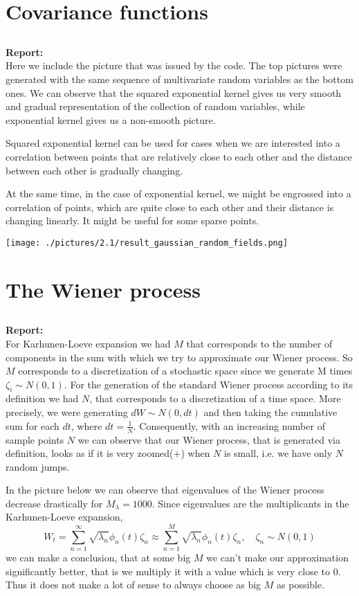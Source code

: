 \documentclass[11pt]{article}
\newcommand{\subass}{\subsection{}}
\newcommand{\report}{\textbf{Report: \\}}
\begin{document}
\section{Covariance functions} 
\subass
\report
Here we include the picture that was issued by the code. The top pictures were generated with the same sequence of multivariate random variables as the bottom ones. We can observe that the squared exponential kernel gives us very smooth and gradual representation of the collection of random variables, while exponential kernel gives us a non-smooth picture.\par
Squared exponential kernel can be used for cases when we are interested into a correlation between points that are relatively close to each other and the distance between each other is gradually changing.\par 
At the same time, in the case of exponential kernel, we might be engrossed into a correlation of points, which are quite close to each other and their distance is changing linearly. It might be useful for some sparse points.

\texttt{[image: ./pictures/2.1/result\_gaussian\_random\_fields.png]}

\section{The Wiener process} 
\subass
\report
For Karhunen-Loeve expansion we had $M$ that corresponds to the number of components in the sum with which we try to approximate our Wiener process. So $M$ corresponds to a discretization of a stochastic space since we generate M times $\zeta_i \sim N(0,1)$.
For the generation of the standard Wiener process according to its definition we had $N$, that corresponds to a discretization of a time space. More precisely, we were generating $dW \sim N(0, dt)$ and then taking the cumulative sum for each $dt$, where $dt = \frac{1}{N}$. Consequently, with an increasing number of sample points $N$ we can observe that our Wiener process, that is generated via definition, looks as if it is very zoomed(+) when $N$ is small, i.e. we have only $N$ random jumps.\par

In the picture below we can observe that eigenvalues of the Wiener process decrease drastically for $M_{\lambda} = 1000.$ Since eigenvalues are the multiplicants in the Karhunen-Loeve expansion,
$$ W_t = \sum_{n = 1}^{\infty}\sqrt{\lambda_n} \phi_n(t)\zeta_n \approx \sum_{n = 1}^{M}\sqrt{\lambda_n} \phi_n(t)\zeta_n, \quad \zeta_n \sim N(0,1)
$$
we can make a conclusion, that at some big $M$ we can't make our approximation significantly better, that is we multiply it with a value which is very close to $0$. Thus it does not make a lot of sense to always choose as big $M$ as possible.\par 
\end{document}
